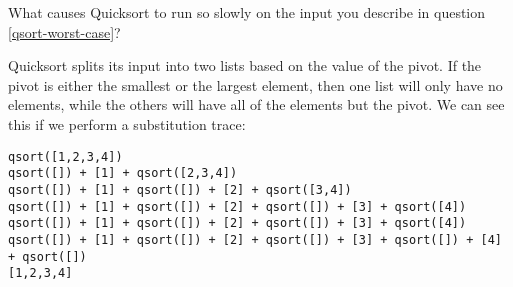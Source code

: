 What causes Quicksort to run so slowly on the input you describe in question \ref{qsort-worst-case}?

    \begin{answer}
    Quicksort splits its input into two lists based on the value of the pivot.
    If the pivot is either the smallest or the largest element, then one list
    will only have no elements, while the others will have all of the elements
    but the pivot. We can see this if we perform a substitution trace:
\begin{verbatim}
qsort([1,2,3,4])
qsort([]) + [1] + qsort([2,3,4])
qsort([]) + [1] + qsort([]) + [2] + qsort([3,4])
qsort([]) + [1] + qsort([]) + [2] + qsort([]) + [3] + qsort([4])
qsort([]) + [1] + qsort([]) + [2] + qsort([]) + [3] + qsort([4])
qsort([]) + [1] + qsort([]) + [2] + qsort([]) + [3] + qsort([]) + [4] + qsort([])
[1,2,3,4]
\end{verbatim}
    \end{answer}